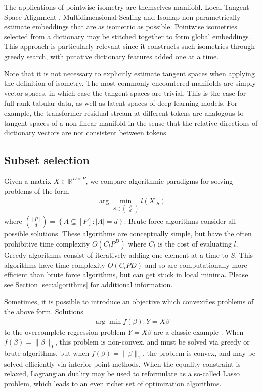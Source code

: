 The applications of pointwise isometry are themselves manifold.
Local Tangent Space Alignment \citep{ZhangZ:04}, Multidimensional Scaling \citep{ChenBuja:localMDS09} and Isomap \citep{tenenbaum2000ggf} non-parametrically estimate embeddings that are as isometric as possible.
Pointwise isometries selected from a dictionary may be stitched together to form global embeddings \citep{Kohli2021-lr}.
This approach is particularly relevant since it constructs such isometries through greedy search, with putative dictionary features added one at a time.

Note that it is not necessary to explicitly estimate tangent spaces when applying the definition of isometry.
The most commonly encountered manifolds are simply vector spaces, in which case the tangent spaces are trivial.
This is the case for full-rank tabular data, as well as latent spaces of deep learning models.
For example, the transformer residual stream at different tokens are analogous to tangent spaces of a non-linear manifold in the sense that the relative directions of dictionary vectors are not consistent between tokens.

\subsection{Subset selection}

Given a matrix $ X \in \mathbb R^{D \times P}$, we compare algorithmic paradigms for solving problems of the form
\begin{align}
\label{prog:ground_truth}
\arg \min_{ S \in \binom{[P]}{d}} l ( X_{. S})
\end{align}
where $\binom{[P]}{d} = \left\{ A \subseteq [P] : \left|A\right| = d \right\}$.
Brute force algorithms consider all possible solutions.
These algorithms are conceptually simple, but have the often prohibitive time complexity $O(C_lP^D)$ where $C_l$ is the cost of evaluating $l$.
Greedy algorithms consist of iteratively adding one element at a time to $ S$.
This algorithms have time complexity $O(C_lPD)$ and so are computationally more efficient than brute force algorithms, but can get stuck in local minima.
Please see Section \ref{sec:algorithms} for additional information.

Sometimes, it is possible to introduce an objective which convexifies problems of the above form.
Solutions
\begin{align}
\arg \min f(\beta) : Y  = X\beta 
\end{align}
to the overcomplete regression problem $Y = X \beta$ are a classic example \cite{Chen2001-hh}.
When $f(\beta) = \|\beta\|_0$, this problem is non-convex, and must be solved via greedy or brute algorithms, but when $f(\beta) =\|\beta\|_1$, the problem is convex, and may be solved efficiently via interior-point methods.
When the equality constraint is relaxed, Lagrangian duality may be used to reformulate as a so-called Lasso problem, which leads to an even richer set of optimization algorithms. %


